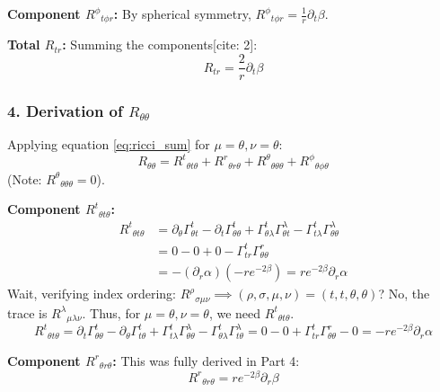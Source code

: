 \documentclass[11pt, a4paper]{report}
\begin{document}
\textbf{Component ${R^\phi}_{t\phi r}$:}
By spherical symmetry, ${R^\phi}_{t\phi r} = \frac{1}{r} \partial_t \beta$.

\textbf{Total $R_{tr}$:}
Summing the components[cite: 2]:
\begin{equation}
    R_{tr} = \frac{2}{r} \partial_t \beta
\end{equation}

\subsubsection*{4. Derivation of $R_{\theta\theta}$}

Applying equation \eqref{eq:ricci_sum} for $\mu=\theta, \nu=\theta$:
\begin{equation}
    R_{\theta\theta} = {R^t}_{\theta t\theta} + {R^r}_{\theta r\theta} + {R^\theta}_{\theta\theta\theta} + {R^\phi}_{\theta\phi\theta}
\end{equation}
(Note: ${R^\theta}_{\theta\theta\theta} = 0$).

\textbf{Component ${R^t}_{\theta t\theta}$:}
\begin{align}
    {R^t}_{\theta t\theta} &= \partial_\theta \Gamma^t_{\theta t} - \partial_t \Gamma^t_{\theta\theta} + \Gamma^t_{\theta\lambda}\Gamma^\lambda_{\theta t} - \Gamma^t_{t\lambda}\Gamma^\lambda_{\theta\theta} \nonumber \\
    &= 0 - 0 + 0 - \Gamma^t_{tr}\Gamma^r_{\theta\theta} \nonumber \\
    &= -(\partial_r \alpha) \left( -r e^{-2\beta} \right) = r e^{-2\beta} \partial_r \alpha
\end{align}
Wait, verifying index ordering: ${R^\rho}_{\sigma\mu\nu} \implies (\rho, \sigma, \mu, \nu) = (t, t, \theta, \theta)$? No, the trace is ${R^\lambda}_{\mu\lambda\nu}$. Thus, for $\mu=\theta, \nu=\theta$, we need ${R^t}_{\theta t\theta}$.
\begin{equation}
    {R^t}_{\theta t\theta} = \partial_t \Gamma^t_{\theta\theta} - \partial_\theta \Gamma^t_{t\theta} + \Gamma^t_{t\lambda}\Gamma^\lambda_{\theta\theta} - \Gamma^t_{\theta\lambda}\Gamma^\lambda_{t\theta} = 0 - 0 + \Gamma^t_{tr}\Gamma^r_{\theta\theta} - 0 = -r e^{-2\beta} \partial_r \alpha \label{eq:Rt_th_t_th}
\end{equation}

\textbf{Component ${R^r}_{\theta r\theta}$:}
This was fully derived in Part 4:
\begin{equation}
    {R^r}_{\theta r\theta} = r e^{-2\beta} \partial_r \beta
\end{equation}
\end{document}
